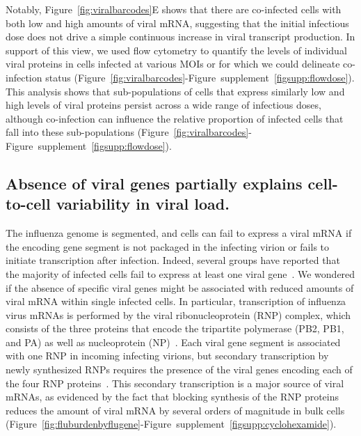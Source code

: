 \documentclass[9pt,lineno]{elife}
\begin{document}
Notably, Figure~\ref{fig:viralbarcodes}E shows that there are co-infected cells with both low and high amounts of viral mRNA, suggesting that the initial infectious dose does not drive a simple continuous increase in viral transcript production.
In support of this view, we used flow cytometry to quantify the levels of individual viral proteins in cells infected at various MOIs or for which we could delineate co-infection status (Figure~\ref{fig:viralbarcodes}-Figure~supplement~\ref{figsupp:flowdose}).
This analysis shows that sub-populations of cells that express similarly low and high levels of viral proteins persist across a wide range of infectious doses, although co-infection can influence the relative proportion of infected cells that fall into these sub-populations (Figure~\ref{fig:viralbarcodes}-Figure~supplement~\ref{figsupp:flowdose}).

\subsection{Absence of viral genes partially explains cell-to-cell variability in viral load.}
The influenza genome is segmented, and cells can fail to express a viral mRNA if the encoding gene segment is not packaged in the infecting virion or fails to initiate transcription after infection.
Indeed, several groups have reported that the majority of infected cells fail to express at least one viral gene~\citep{Brooke:2013kb, Heldt:2015iz,Dou:2017cp}. 
We wondered if the absence of specific viral genes might be associated with reduced amounts of viral mRNA within single infected cells.
In particular, transcription of influenza virus mRNAs is performed by the viral ribonucleoprotein (RNP) complex, which consists of the three proteins that encode the tripartite polymerase (PB2, PB1, and PA) as well as nucleoprotein (NP)~\citep{huang1990determination}.
Each viral gene segment is associated with one RNP in incoming infecting virions, but secondary transcription by newly synthesized RNPs requires the presence of the viral genes encoding each of the four RNP proteins~\citep{Vreede:2004ip,eisfeld2015centre}.
This secondary transcription is a major source of viral mRNAs, as evidenced by the fact that blocking synthesis of the RNP proteins reduces the amount of viral mRNA by several orders of magnitude in bulk cells (Figure~\ref{fig:fluburdenbyflugene}-Figure~supplement~\ref{figsupp:cyclohexamide}).
\end{document}
